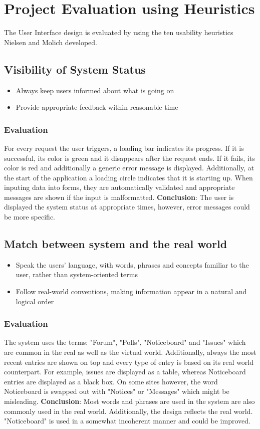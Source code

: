 \section{Project Evaluation using Heuristics}
The User Interface design is evaluated by using the ten usability heuristics Nielsen and Molich developed.

\subsection{Visibility of System Status}
\begin{itemize}
    \item Always keep users informed about what is going on
    \item Provide appropriate feedback within reasonable time
\end{itemize}

\subsubsection{Evaluation}
For every request the user triggers, a loading bar indicates its progress. If it is successful, its color is green and it disappears after the request ends. If it fails, its color is red and additionally a generic error message is displayed. Additionally, at the start of the application a loading circle indicates that it is starting up. When inputing data into forms, they are automatically validated and appropriate messages are shown if the input is malformatted. \textbf{Conclusion}: The user is displayed the system status at appropriate times, however, error messages could be more specific.


\subsection{Match between system and the real world }

\begin{itemize}
    \item Speak the users' language, with words, phrases and concepts familiar to the user, rather than system-oriented terms
    \item Follow real-world conventions, making information appear in a natural and logical order
\end{itemize}

\subsubsection{Evaluation}
The system uses the terms: "Forum", "Polls", "Noticeboard" and "Issues" which are common in the real as well as the virtual world. Additionally, always the most recent entries are shown on top and every type of entry is based on its real world counterpart. For example, issues are displayed as a table, whereas Noticeboard entries are displayed as a black box. On some sites however, the word Noticeboard is swapped out with "Notices" or "Messages" which might be misleading. \textbf{Conclusion}: Most words and phrases are used in the system are also commonly used in the real world. Additionally, the design reflects the real world. "Noticeboard" is used in a somewhat incoherent manner and could be improved.

